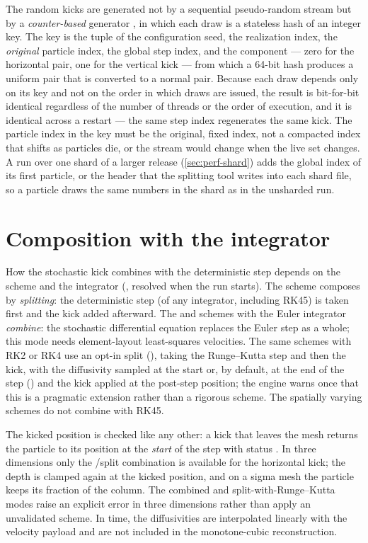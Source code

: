 The random kicks are generated not by a sequential pseudo-random stream but by a \emph{counter-based}
generator \citep{salmon2011philox}, in which each draw is a stateless hash of an integer key. The key is the
tuple of the configuration seed, the realization index, the \emph{original} particle index, the global step
index, and the component --- zero for the horizontal pair, one for the vertical kick --- from which a 64-bit
hash produces a uniform pair that is converted to a normal pair. Because each draw depends only on its key
and not on the order in which draws are issued, the result is bit-for-bit identical regardless of the
number of threads or the order of execution, and it is identical across a restart --- the same step index
regenerates the same kick. The particle index in the key must be the original, fixed index, not a
compacted index that shifts as particles die, or the stream would change when the live set changes. A run
over one shard of a larger release (\cref{sec:perf-shard}) adds the global index of its first particle,
 or the header that the splitting tool writes into each shard file, so a
particle draws the same numbers in the shard as in the unsharded run.

\section{Composition with the integrator}\label{sec:diff-composition}

How the stochastic kick combines with the deterministic step depends on the scheme and the integrator
(, resolved when the run starts). The  scheme composes by
\emph{splitting}: the deterministic step (of any integrator, including RK45) is taken first and the kick
added afterward. The  and  schemes with the Euler integrator \emph{combine}: the
stochastic differential equation replaces the Euler step as a whole; this mode needs element-layout
least-squares velocities. The same schemes with RK2 or RK4 use an opt-in split
(), taking the Runge--Kutta step and then the kick, with the diffusivity
sampled at the start or, by default, at the end of the step () and the kick applied
at the post-step position; the engine warns once that this is a pragmatic extension rather than a rigorous
scheme. The spatially varying schemes do not combine with RK45.

The kicked position is checked like any other: a kick that leaves the mesh returns the particle to its
position at the \emph{start} of the step with status . In three dimensions only the
/split combination is available for the horizontal kick; the depth is clamped again at the
kicked position, and on a sigma mesh the particle keeps its fraction of the column. The combined and
split-with-Runge--Kutta modes raise an explicit error in three dimensions rather than apply an unvalidated
scheme. In time, the diffusivities are interpolated linearly with the velocity payload and are not included
in the monotone-cubic reconstruction.


